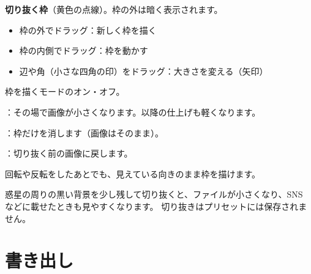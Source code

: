 
\begin{marklist}
  \item \textbf{切り抜く枠}（黄色の点線）。枠の外は暗く表示されます。
        \begin{itemize}[itemsep=0pt, topsep=1pt]
          \item 枠の外でドラッグ：新しく枠を描く
          \item 枠の内側でドラッグ：枠を動かす
          \item 辺や角（小さな四角の印）をドラッグ：大きさを変える（矢印）
        \end{itemize}
  \item 枠を描くモードのオン・オフ。
  \item {}：その場で画像が小さくなります。以降の仕上げも軽くなります。
  \item {}：枠だけを消します（画像はそのまま）。
  \item {}：切り抜く前の画像に戻します。
  \item 回転や反転をしたあとでも、見えている向きのまま枠を描けます。
\end{marklist}

\begin{tip}
  惑星の周りの黒い背景を少し残して切り抜くと、ファイルが小さくなり、SNS などに載せたときも見やすくなります。
  切り抜きはプリセットには保存されません。
\end{tip}

\section{書き出し}\label{sec:export}


